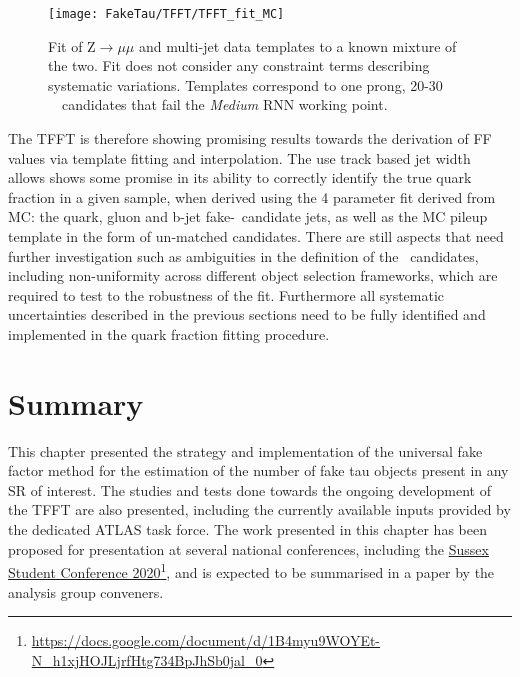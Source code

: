 		\begin{figure}[!hbt]
	\centering
	\texttt{[image: FakeTau/TFFT/TFFT\_fit\_MC]}
	\caption{Fit of Z$\rightarrow\mu\mu$ and multi-jet data templates to a known mixture of the two. Fit does not consider any constraint terms describing systematic variations. Templates correspond to one prong, 20-30 \gev\ \htau\ candidates that fail the \textit{Medium} \ac{RNN} working point.}
	\label{fig:TFFT_fit_MC}
	\end{figure}
	The \ac{TFFT} is therefore showing promising results towards the derivation of \ac{FF} values via template fitting and interpolation. 
	The use track based jet width allows shows some promise in its ability to correctly identify the true quark fraction in a given sample, when derived using the 4 parameter fit derived from \ac{MC}: the quark, gluon and b-jet fake-\htau\ candidate jets, as well as the \ac{MC} pileup template in the form of un-matched candidates.
	There are still aspects that need further investigation such as ambiguities in the definition of the \htau\ candidates, including non-uniformity across different object selection frameworks, which are required to test to the robustness of the fit. Furthermore all systematic uncertainties described in the previous sections need to be fully identified and implemented in the quark fraction fitting procedure. 
	
	\section{Summary}
	\label{sec:summary}
	This chapter presented the strategy and implementation of the universal fake factor method for the estimation of the number of fake tau objects present in any \ac{SR} of interest. 
	The studies and tests done towards the ongoing development of the \ac{TFFT} are also presented, including the currently available inputs provided by the dedicated \ac{ATLAS} task force. 
	The work presented in this chapter has been proposed for presentation at several national conferences, including the \href{https://docs.google.com/document/d/1B4myu9WOYEt-N\_h1xjHOJLjrfHtg734BpJhSb0jal\_0}{Sussex Student Conference 2020}\footnote{ \href{https://docs.google.com/document/d/1B4myu9WOYEt-N\_h1xjHOJLjrfHtg734BpJhSb0jal\_0}{https://docs.google.com/document/d/1B4myu9WOYEt-N\_h1xjHOJLjrfHtg734BpJhSb0jal\_0}}, and is expected to be summarised in a paper by the analysis group conveners.
